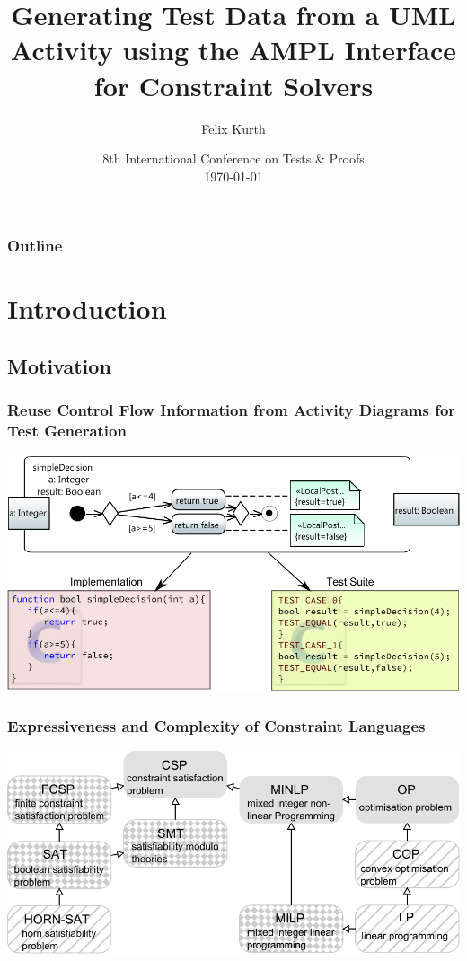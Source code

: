 \documentclass{beamer}
\title[Automated Generation of Test Data using AMPL]{Generating Test Data from a UML Activity using the AMPL Interface for Constraint Solvers}
\author[F. Kurth]{Felix Kurth}
\institute[sts.tuhh.de]
{
Institute for Software Systems\\
Hamburg University of Technology
}
\date[TAP2014]{8th International Conference on Tests \& Proofs\\
\today
}
\begin{document}
\begin{frame}
\titlepage
\end{frame}

\begin{frame}
\frametitle{Outline}
\tableofcontents
\end{frame}

\section{Introduction}
\subsection{Motivation}


\begin{frame}
\frametitle{Reuse Control Flow Information from Activity Diagrams for Test Generation}
\includegraphics[width=\textwidth]{../Thesis/pics/BasicExamplesSimpleDecision.pdf}
\end{frame}

\begin{frame}
\frametitle{Expressiveness and Complexity of Constraint Languages}
\includegraphics[width=\textwidth]{pics/ProblemLatice.pdf}
\end{frame}
\end{document}

